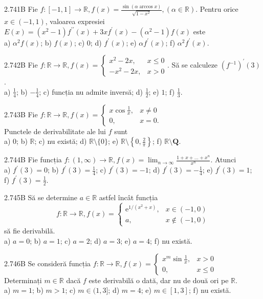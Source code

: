 \documentclass[11pt]{article}
\begin{document}
2.741B Fie $f:[-1,1] \rightarrow \mathbb{R}, f(x)=\frac{\sin (\alpha \arccos x)}{\sqrt{1-x^{2}}},(\alpha \in \mathbb{R})$. Pentru orice $x \in(-1,1)$, valoarea expresiei $E(x)=\left(x^{2}-1\right) f^{\prime \prime}(x)+3 x f^{\prime}(x)-\left(\alpha^{2}-1\right) f(x)$ este\\ a) $\alpha^{2} f(x)$; b) $f(x)$; c) $0$; d) $f^{\prime}(x)$; e) $\alpha f^{\prime}(x)$; f) $\alpha^{2} f^{\prime}(x)$.

2.742B Fie $f: \mathbb{R} \rightarrow \mathbb{R}, f(x)=\left\{\begin{array}{ll}x^{2}-2 x, & x \leq 0 \\ -x^{2}-2 x, & x>0\end{array}\right.$. Să se calculeze $\left(f^{-1}\right)^{\prime}(3)$.\\ a) $\frac{1}{4}$; b) $-\frac{1}{4}$; c) funcția nu admite inversă; d) $\frac{1}{2}$; e) $1$; f) $\frac{1}{3}$.

2.743B Fie $f: \mathbb{R} \rightarrow \mathbb{R}, f(x)= \begin{cases}x \cos \frac{1}{x}, & x \neq 0 \\ 0, & x=0 .\end{cases}$\\Punctele de derivabilitate ale lui $f$ sunt\\ a) $0$; b) $\mathbb{R}$; c) nu există; d) $\mathbb{R} \setminus\{0\}$; e) $\mathbb{R} \setminus\left\{0, \frac{2}{\pi}\right\}$; f) $\mathbb{R} \setminus \mathbf{Q}$.

2.744B Fie funcția $f:(1, \infty) \rightarrow \mathbb{R}, f(x)=\lim _{n \rightarrow \infty} \frac{1+x+\ldots+x^{n}}{x^{n}}$. Atunci\\ a) $f^{\prime}(3)=0$; b) $f^{\prime}(3)=\frac{1}{4}$; c) $f^{\prime}(3)=-1$; d) $f^{\prime}(3)=-\frac{1}{4}$; e) $f^{\prime}(3)=1$;\\ f) $f^{\prime}(3)=\frac{1}{2}$.

2.745B Să se determine $a \in \mathbb{R}$ astfel încât funcția $$f: \mathbb{R} \rightarrow \mathbb{R}, f(x)= \begin{cases}\mathrm{e}^{1 /\left(x^{2}+x\right)}, & x \in(-1,0) \\ a, & x \notin(-1,0)\end{cases}$$ să fie derivabilă.\\ a) $a=0$; b) $a=1$; c) $a=2$; d) $a=3$; e) $a=4$; f) nu există.

2.746B Se consideră funcția $f: \mathbb{R} \rightarrow \mathbb{R}, f(x)= \begin{cases}x^{m} \sin \frac{1}{x}, & x>0 \\ 0, & x \leq 0\end{cases}$\\Determinați $m \in \mathbb{R}$ dacă $f$ este derivabilă o dată, dar nu de două ori pe $\mathbb{R}$.\\ a) $m=1$; b) $m>1$; c) $m \in(1,3]$; d) $m=4$; e) $m \in[1,3]$; f) nu există.
\end{document}
